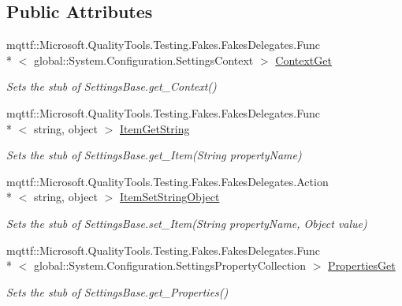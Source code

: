 \subsection*{Public Attributes}
\begin{DoxyCompactItemize}
\item 
mqttf\-::\-Microsoft.\-Quality\-Tools.\-Testing.\-Fakes.\-Fakes\-Delegates.\-Func\\*
$<$ global\-::\-System.\-Configuration.\-Settings\-Context $>$ \hyperlink{class_system_1_1_configuration_1_1_fakes_1_1_stub_settings_base_acf04addfca8a7888cb8f65ae8486521d}{Context\-Get}
\begin{DoxyCompactList}\small\item\em Sets the stub of Settings\-Base.\-get\-\_\-\-Context()\end{DoxyCompactList}\item 
mqttf\-::\-Microsoft.\-Quality\-Tools.\-Testing.\-Fakes.\-Fakes\-Delegates.\-Func\\*
$<$ string, object $>$ \hyperlink{class_system_1_1_configuration_1_1_fakes_1_1_stub_settings_base_a256f7fd4bfc4f1af267dcdf79cdf65a1}{Item\-Get\-String}
\begin{DoxyCompactList}\small\item\em Sets the stub of Settings\-Base.\-get\-\_\-\-Item(\-String property\-Name)\end{DoxyCompactList}\item 
mqttf\-::\-Microsoft.\-Quality\-Tools.\-Testing.\-Fakes.\-Fakes\-Delegates.\-Action\\*
$<$ string, object $>$ \hyperlink{class_system_1_1_configuration_1_1_fakes_1_1_stub_settings_base_a768d290400072288ee69cfd4d76a8cff}{Item\-Set\-String\-Object}
\begin{DoxyCompactList}\small\item\em Sets the stub of Settings\-Base.\-set\-\_\-\-Item(\-String property\-Name, Object value)\end{DoxyCompactList}\item 
mqttf\-::\-Microsoft.\-Quality\-Tools.\-Testing.\-Fakes.\-Fakes\-Delegates.\-Func\\*
$<$ global\-::\-System.\-Configuration.\-Settings\-Property\-Collection $>$ \hyperlink{class_system_1_1_configuration_1_1_fakes_1_1_stub_settings_base_a95e3db8fafe78b265086ff26ed463a3c}{Properties\-Get}
\begin{DoxyCompactList}\small\item\em Sets the stub of Settings\-Base.\-get\-\_\-\-Properties()\end{DoxyCompactList}\item 

\end{DoxyCompactItemize}
